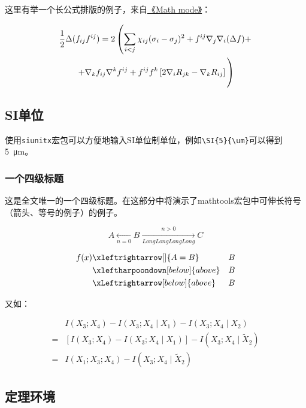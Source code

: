 \documentclass[doctor,openright,twoside]{sjtuthesis}
\theoremstyle{plain}
\theoremstyle{definition}
\theoremstyle{remark}
\theoremstyle{ocrenumbox}
\theoremstyle{plain}
\begin{document}
这里有举一个长公式排版的例子，来自\href{http://www.tex.ac.uk/tex-archive/info/math/voss/mathmode/Mathmode.pdf}{《Math mode》}：

\begin {multline}
  \frac {1}{2}\Delta (f_{ij}f^{ij})=
  2\left (\sum _{i<j}\chi _{ij}(\sigma _{i}-
    \sigma _{j}) ^{2}+ f^{ij}\nabla _{j}\nabla _{i}(\Delta f)+\right .\\
  \left .+\nabla _{k}f_{ij}\nabla ^{k}f^{ij}+
    f^{ij}f^{k}\left [2\nabla _{i}R_{jk}-
      \nabla _{k}R_{ij}\right ]\vphantom {\sum _{i<j}}\right )
\end{multline}

\subsection{SI单位}

使用\verb+siunitx+宏包可以方便地输入SI单位制单位，例如\verb+\SI{5}{\um}+可以得到\SI{5}{\um}。

\subsubsection{一个四级标题}
\label{sec:depth4}

这是全文唯一的一个四级标题。在这部分中将演示了mathtools宏包中可伸长符号（箭头、等号的例子）的例子。

\begin{displaymath}
    A \xleftarrow[n=0]{} B \xrightarrow[LongLongLongLong]{n>0} C
\end{displaymath}

\begin{eqnarray}
  f(x) & \xleftrightarrow[]{A=B}  & B \\
  & \xleftharpoondown[below]{above} & B \nonumber \\
  & \xLeftrightarrow[below]{above} & B
\end{eqnarray}

又如：

\begin{align}
  \label{eq:none}
  & I(X_3;X_4)-I(X_3;X_4\mid{}X_1)-I(X_3;X_4\mid{}X_2) \nonumber \\
  = & [I(X_3;X_4)-I(X_3;X_4\mid{}X_1)]-I(X_3;X_4\mid{}\tilde{X}_2) \\
  = & I(X_1;X_3;X_4)-I(X_3;X_4\mid{}\tilde{X}_2)
\end{align}

\subsection{定理环境}
\end{document}
